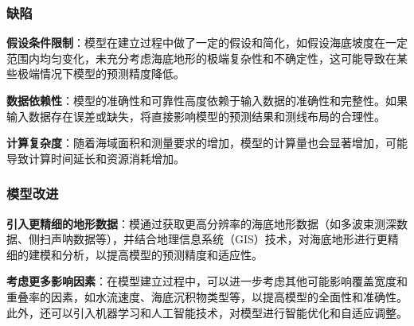 \documentclass{cumcmthesis}
\begin{document}
\subsubsection{缺陷}

\textbf{假设条件限制}：模型在建立过程中做了一定的假设和简化，如假设海底坡度在一定范围内均匀变化，未充分考虑海底地形的极端复杂性和不确定性，这可能导致在某些极端情况下模型的预测精度降低。

\textbf{数据依赖性}：模型的准确性和可靠性高度依赖于输入数据的准确性和完整性。如果输入数据存在误差或缺失，将直接影响模型的预测结果和测线布局的合理性。

\textbf{计算复杂度}：随着海域面积和测量要求的增加，模型的计算量也会显著增加，可能导致计算时间延长和资源消耗增加。

\subsubsection{模型改进}

\textbf{引入更精细的地形数据}：模通过获取更高分辨率的海底地形数据（如多波束测深数据、侧扫声呐数据等），并结合地理信息系统（GIS）技术，对海底地形进行更精细的建模和分析，以提高模型的预测精度和适应性。

\textbf{考虑更多影响因素}：在模型建立过程中，可以进一步考虑其他可能影响覆盖宽度和重叠率的因素，如水流速度、海底沉积物类型等，以提高模型的全面性和准确性。此外，还可以引入机器学习和人工智能技术，对模型进行智能优化和自适应调整。
\end{document}
